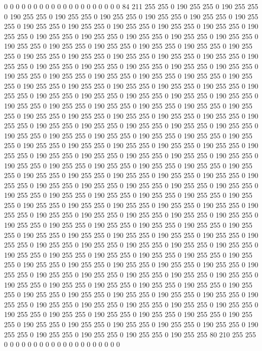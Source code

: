 0 0 0 0 0 0 0 0 0 0 0 0 0 0 0 0 0 0 0 0 84 211 255 255 0 190 255 255 0 190 255 255 0 190 255 255 0 190 255 255 0 190 255 255 0 190 255 255 0 190 255 255 0 190 255 255 0 190 255 255 0 190 255 255 0 190 255 255 0 190 255 255 0 190 255 255 0 190 255 255 0 190 255 255 0 190 255 255 0 190 255 255 0 190 255 255 0 190 255 255 0 190 255 255 0 190 255 255 0 190 255 255 0 190 255 255 0 190 255 255 0 190 255 255 0 190 255 255 0 190 255 255 0 190 255 255 0 190 255 255 0 190 255 255 0 190 255 255 0 190 255 255 0 190 255 255 0 190 255 255 0 190 255 255 0 190 255 255 0 190 255 255 0 190 255 255 0 190 255 255 0 190 255 255 0 190 255 255 0 190 255 255 0 190 255 255 0 190 255 255 
0 190 255 255 0 190 255 255 0 190 255 255 0 190 255 255 0 190 255 255 0 190 255 255 0 190 255 255 0 190 255 255 0 190 255 255 0 190 255 255 0 190 255 255 0 190 255 255 0 190 255 255 0 190 255 255 0 190 255 255 0 190 255 255 0 190 255 255 0 190 255 255 0 190 255 255 0 190 255 255 0 190 255 255 0 190 255 255 0 190 255 255 0 190 255 255 0 190 255 255 0 190 255 255 0 190 255 255 0 190 255 255 0 190 255 255 0 190 255 255 0 190 255 255 0 190 255 255 0 190 255 255 0 190 255 255 0 190 255 255 0 190 255 255 0 190 255 255 0 190 255 255 0 190 255 255 0 190 255 255 0 190 255 255 0 190 255 255 0 190 255 255 0 190 255 255 0 190 255 255 0 190 255 255 0 190 255 255 0 190 255 255 0 190 255 255 0 190 255 255 
0 190 255 255 0 190 255 255 0 190 255 255 0 190 255 255 0 190 255 255 0 190 255 255 0 190 255 255 0 190 255 255 0 190 255 255 0 190 255 255 0 190 255 255 0 190 255 255 0 190 255 255 0 190 255 255 0 190 255 255 0 190 255 255 0 190 255 255 0 190 255 255 0 190 255 255 0 190 255 255 0 190 255 255 0 190 255 255 0 190 255 255 0 190 255 255 0 190 255 255 0 190 255 255 0 190 255 255 0 190 255 255 0 190 255 255 0 190 255 255 0 190 255 255 0 190 255 255 0 190 255 255 0 190 255 255 0 190 255 255 0 190 255 255 0 190 255 255 0 190 255 255 0 190 255 255 0 190 255 255 0 190 255 255 0 190 255 255 0 190 255 255 0 190 255 255 0 190 255 255 0 190 255 255 0 190 255 255 0 190 255 255 0 190 255 255 0 190 255 255 
0 190 255 255 0 190 255 255 0 190 255 255 0 190 255 255 0 190 255 255 0 190 255 255 0 190 255 255 0 190 255 255 0 190 255 255 0 190 255 255 0 190 255 255 0 190 255 255 0 190 255 255 0 190 255 255 0 190 255 255 0 190 255 255 0 190 255 255 0 190 255 255 0 190 255 255 0 190 255 255 0 190 255 255 0 190 255 255 0 190 255 255 0 190 255 255 0 190 255 255 0 190 255 255 0 190 255 255 0 190 255 255 0 190 255 255 0 190 255 255 0 190 255 255 0 190 255 255 0 190 255 255 0 190 255 255 0 190 255 255 0 190 255 255 0 190 255 255 0 190 255 255 0 190 255 255 0 190 255 255 0 190 255 255 0 190 255 255 0 190 255 255 0 190 255 255 80 210 255 255 0 0 0 0 0 0 0 0 0 0 0 0 0 0 0 0 0 0 0 0 
